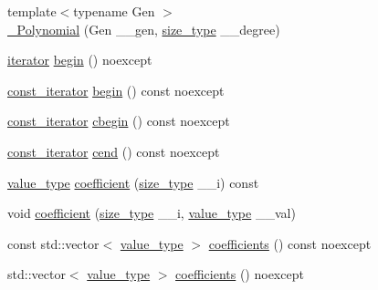 \begin{DoxyCompactItemize}
\item 
{\footnotesize template$<$typename Gen $>$ }\\\hyperlink{class____gnu__cxx_1_1__Polynomial_ad6e0daed9aa3a89cd98441a0fc4fa9f1}{\+\_\+\+Polynomial} (Gen \+\_\+\+\_\+gen, \hyperlink{class____gnu__cxx_1_1__Polynomial_a8b25fcfd4acaad0c5c08b649c22da28a}{size\+\_\+type} \+\_\+\+\_\+degree)
\item 
\hyperlink{class____gnu__cxx_1_1__Polynomial_a64bd557b6af46992e352dbe9e30fa201}{iterator} \hyperlink{class____gnu__cxx_1_1__Polynomial_a2f9cf484724c2aef472975fc3d8bd99d}{begin} () noexcept
\item 
\hyperlink{class____gnu__cxx_1_1__Polynomial_a96e4523cc2a834724fe4224f0800486b}{const\+\_\+iterator} \hyperlink{class____gnu__cxx_1_1__Polynomial_a57902287656245f5ae1ee7406b419c9b}{begin} () const noexcept
\item 
\hyperlink{class____gnu__cxx_1_1__Polynomial_a96e4523cc2a834724fe4224f0800486b}{const\+\_\+iterator} \hyperlink{class____gnu__cxx_1_1__Polynomial_a3309265141727a7581036a2b7632c689}{cbegin} () const noexcept
\item 
\hyperlink{class____gnu__cxx_1_1__Polynomial_a96e4523cc2a834724fe4224f0800486b}{const\+\_\+iterator} \hyperlink{class____gnu__cxx_1_1__Polynomial_ae3d5b393866c55f9585a1e0e10c41cc4}{cend} () const noexcept
\item 
\hyperlink{class____gnu__cxx_1_1__Polynomial_a725563351f50e76084a7a016c06f8a53}{value\+\_\+type} \hyperlink{class____gnu__cxx_1_1__Polynomial_a7cee31b3acbe8c024af6d696bc610f49}{coefficient} (\hyperlink{class____gnu__cxx_1_1__Polynomial_a8b25fcfd4acaad0c5c08b649c22da28a}{size\+\_\+type} \+\_\+\+\_\+i) const
\item 
void \hyperlink{class____gnu__cxx_1_1__Polynomial_a191611909a0461c449984a0898bce38f}{coefficient} (\hyperlink{class____gnu__cxx_1_1__Polynomial_a8b25fcfd4acaad0c5c08b649c22da28a}{size\+\_\+type} \+\_\+\+\_\+i, \hyperlink{class____gnu__cxx_1_1__Polynomial_a725563351f50e76084a7a016c06f8a53}{value\+\_\+type} \+\_\+\+\_\+val)
\item 
const std\+::vector$<$ \hyperlink{class____gnu__cxx_1_1__Polynomial_a725563351f50e76084a7a016c06f8a53}{value\+\_\+type} $>$ \hyperlink{class____gnu__cxx_1_1__Polynomial_ab820a7c08a907ebfb5b8765fcf861ead}{coefficients} () const noexcept
\item 
std\+::vector$<$ \hyperlink{class____gnu__cxx_1_1__Polynomial_a725563351f50e76084a7a016c06f8a53}{value\+\_\+type} $>$ \hyperlink{class____gnu__cxx_1_1__Polynomial_a997df1a87fc9ef82d35ccef585321b4c}{coefficients} () noexcept

\end{DoxyCompactItemize}
